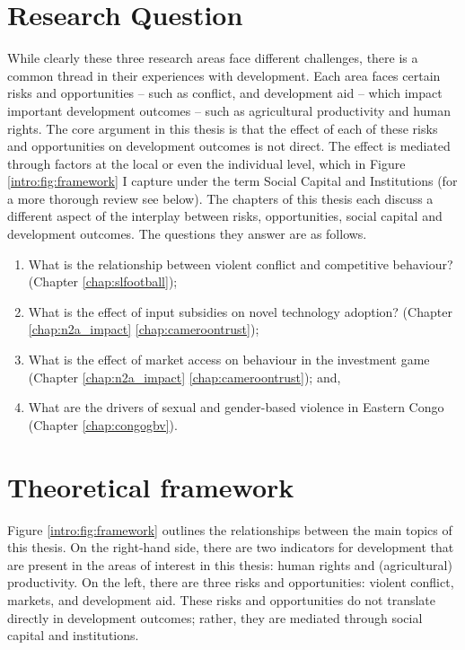 \section{Research Question}
While clearly these three research areas face different challenges, there is a common thread in their experiences with development. Each area faces certain risks and opportunities -- such as conflict, and development aid -- which impact important development outcomes -- such as agricultural productivity and human rights. The core argument in this thesis is that the effect of each of these risks and opportunities on development outcomes is not direct. The effect is mediated through factors at the local or even the individual level, which in Figure \ref{intro:fig:framework} I capture under the term Social Capital and Institutions (for a more thorough review see below). The chapters of this thesis each discuss a different aspect of the interplay between risks, opportunities, social capital and development outcomes. The questions they answer are as follows.
\begin{enumerate}
	\item What is the relationship between violent conflict and competitive behaviour? (Chapter \ref{chap:slfootball});
	\item What is the effect of input subsidies on novel technology adoption? (Chapter \ref{chap:n2a_impact}
\ref{chap:cameroontrust});
	\item What is the effect of market access on behaviour in the investment game (Chapter \ref{chap:n2a_impact}
\ref{chap:cameroontrust}); and,
	\item What are the drivers of sexual and gender-based violence in Eastern Congo (Chapter \ref{chap:congogbv}).
\end{enumerate}

\section{Theoretical framework}
Figure \ref{intro:fig:framework} outlines the relationships between the main topics of this thesis. On the right-hand side, there are two indicators for development that are present in the areas of interest in this thesis: human rights and (agricultural) productivity. On the left, there are three risks and opportunities: violent conflict, markets, and development aid. These risks and opportunities do not translate directly in development outcomes; rather, they are mediated through social capital and institutions.


